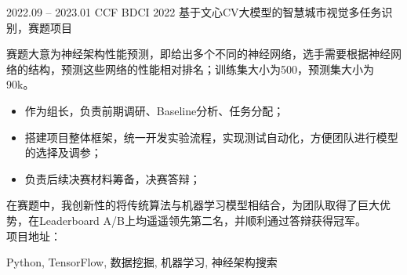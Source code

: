 %
%


 
\begin{experiences}
  \experiencenew
  {2022.09 -- 2023.01} {CCF BDCI 2022 基于文心CV大模型的智慧城市视觉多任务识别，赛题项目}
  {
    赛题大意为神经架构性能预测，即给出多个不同的神经网络，选手需要根据神经网络的结构，预测这些网络的性能相对排名；训练集大小为500，预测集大小为90k。
    \begin{itemize}
      \item  作为组长，负责前期调研、Baseline分析、任务分配；
      \item  搭建项目整体框架，统一开发实验流程，实现测试自动化，方便团队进行模型的选择及调参；
      \item  负责后续决赛材料筹备，决赛答辩；
    \end{itemize}
    在赛题中，我创新性的将传统算法与机器学习模型相结合，为团队取得了巨大优势，在Leaderboard A/B上均遥遥领先第二名，并顺利通过答辩获得冠军。 \\
    项目地址：
                }
                {Python, TensorFlow, 数据挖掘, 机器学习, 神经架构搜索}
                

\end{experiences}

